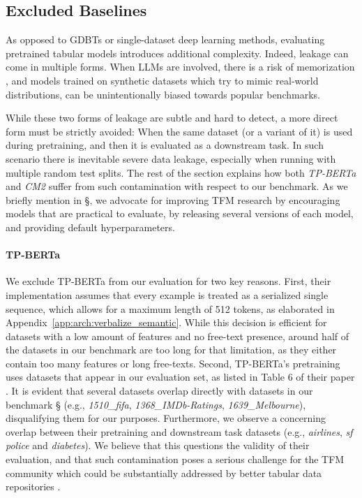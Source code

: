 \subsection{Excluded Baselines}
\label{app:baseline_exclude}


As opposed to GDBTs or single-dataset deep learning methods, evaluating pretrained tabular models introduces additional complexity. Indeed, leakage can come in multiple forms. When LLMs are involved, there is a risk of memorization \cite{bordt_elephants_2024}, and models trained on synthetic datasets \cite{hollmann_accurate_2025} which try to mimic real-world distributions, can be unintentionally biased towards popular benchmarks. 

While these two forms of leakage are subtle and hard to detect, a more direct form must be strictly avoided: When the same dataset (or a variant of it) is used during pretraining, and then it is evaluated as a downstream task. In such scenario there is inevitable severe data leakage, especially when running with multiple random test splits. The rest of the section explains how both \textit{TP-BERTa} \cite{yan_making_2023} and \textit{CM2} \cite{ye_towards_2024} suffer from such contamination with respect to our benchmark. As we briefly mention in \S{}, we advocate for improving TFM research by encouraging models that are practical to evaluate, by releasing several versions of each model, and providing default hyperparameters.

\paragraph{TP-BERTa} We exclude TP-BERTa from our evaluation for two key reasons. First, their implementation assumes that every example is treated as a serialized single sequence, which allows for a maximum length of 512 tokens, as elaborated in Appendix~\ref{app:arch:verbalize_semantic}. While this decision is efficient for datasets with a low amount of features and no free-text presence, around half of the datasets in our benchmark are too long for that limitation, as they either contain too many features or long free-texts. Second, TP-BERTa's pretraining uses datasets that appear in our evaluation set, as listed in Table 6 of their paper \cite{yan_making_2023}. It is evident that several datasets overlap directly with datasets in our benchmark \S{} (e.g., \textit{1510\_fifa}, \textit{1368\_IMDb-Ratings}, \textit{1639\_Melbourne}), disqualifying them for our purposes. Furthermore, we observe a concerning overlap between their pretraining and downstream task datasets (e.g., \textit{airlines}, \textit{sf police} and \textit{diabetes}). We believe that this questions the validity of their evaluation, and that such contamination poses a serious challenge for the TFM community which could be substantially addressed by better tabular data repositories \cite{tschalzev_unreflected_2025}.

